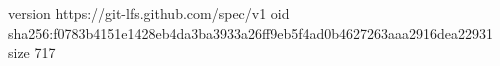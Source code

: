version https://git-lfs.github.com/spec/v1
oid sha256:f0783b4151e1428eb4da3ba3933a26ff9eb5f4ad0b4627263aaa2916dea22931
size 717
